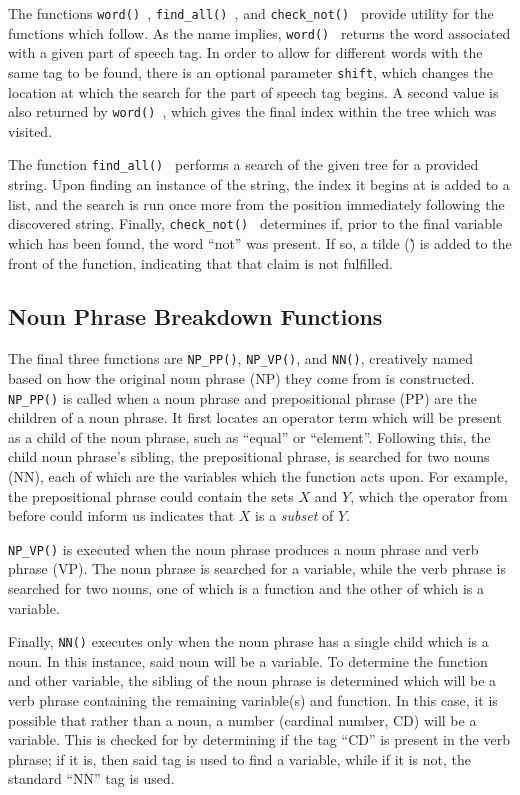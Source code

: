 The functions \texttt{word() }, \texttt{find\_all() }, and \texttt{check\_not() } provide utility for the functions which follow. As the name implies, \texttt{word() } returns the word associated with a given part of speech tag. In order to allow for different words with the same tag to be found, there is an optional parameter \texttt{shift}, which changes the location at which the search for the part of speech tag begins. A second value is also returned by \texttt{word() }, which gives the final index within the tree which was visited.

The function \texttt{find\_all() } performs a search of the given tree for a provided string. Upon finding an instance of the string, the index it begins at is added to a list, and the search is run once more from the position immediately following the discovered string. Finally, \texttt{check\_not() } determines if, prior to the final variable which has been found, the word ``not'' was present. If so, a tilde (\~) is added to the front of the function, indicating that that claim is not fulfilled.

\subsection{Noun Phrase Breakdown Functions}

The final three functions are \texttt{NP\_PP()}, \texttt{NP\_VP()}, and \texttt{NN()}, creatively named based on how the original noun phrase (NP) they come from is constructed. \texttt{NP\_PP()} is called when a noun phrase and prepositional phrase (PP) are the children of a noun phrase. It first locates an operator term which will be present as a child of the noun phrase, such as ``equal'' or ``element''. Following this, the child noun phrase's sibling, the prepositional phrase, is searched for two nouns (NN), each of which are the variables which the function acts upon. For example, the prepositional phrase could contain the sets $X$ and $Y$, which the operator from before could inform us indicates that $X$ is a \textit{subset} of $Y$.

\label{npvp}
\texttt{NP\_VP()} is executed when the noun phrase produces a noun phrase and verb phrase (VP). The noun phrase is searched for a variable, while the verb phrase is searched for two nouns, one of which is a function and the other of which is a variable.

Finally, \texttt{NN()} executes only when the noun phrase has a single child which is a noun. In this instance, said noun will be a variable. To determine the function and other variable, the sibling of the noun phrase is determined which will be a verb phrase containing the remaining variable(s) and function. In this case, it is possible that rather than a noun, a number (cardinal number, CD) will be a variable. This is checked for by determining if the tag ``CD'' is present in the verb phrase; if it is, then said tag is used to find a variable, while if it is not, the standard ``NN'' tag is used.

